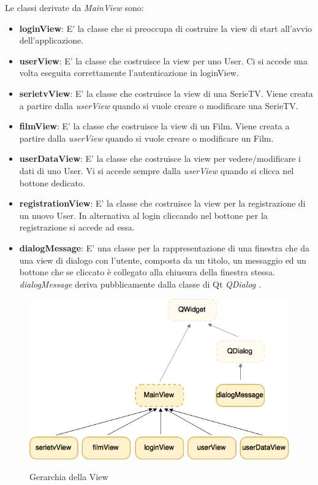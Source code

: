 \documentclass[10pt,a4paper,openany]{article}
\begin{document}
	Le classi derivate da \emph{MainView} sono:
	\begin{itemize}
		\item \textbf{loginView}: E' la classe che si preoccupa di costruire la view di start all'avvio dell'applicazione.
		\item \textbf{userView}: E' la classe che costruisce la view per uno User. Ci si accede una volta eseguita correttamente l'autenticazione in loginView.
		\item \textbf{serietvView}: E' la classe che costruisce la view di una SerieTV. Viene creata a partire dalla \emph{userView} quando si vuole creare o modificare 
		una SerieTV.
		\item \textbf{filmView}: E' la classe che costruisce la view di un Film. Viene creata a partire dalla \emph{userView} quando si vuole creare o modificare 
		un Film.
		\item \textbf{userDataView}: E' la classe che costruisce la view per vedere/modificare i dati di uno User. Vi si accede sempre dalla \emph{userView} quando
		si clicca nel bottone dedicato.
		\item \textbf{registrationView}: E' la classe che costruisce la view per la registrazione di un nuovo User.  In alternativa al login cliccando nel bottone per la 
		registrazione si accede ad essa.
		\item \textbf{dialogMessage}: E' una classe per la rappresentazione di una finestra che da una view di dialogo con l'utente, composta da un titolo, un 
		messaggio ed un bottone che se cliccato è collegato alla chiusura della finestra stessa. \emph{dialogMessage} deriva pubblicamente dalla classe di Qt 
		\emph{QDialog} .
	\end{itemize}
		
		\newpage
		
		
		\begin{figure}[!h]
			\centering
			\includegraphics[angle=0,scale=.50]{View.png}\\
			\caption{Gerarchia della View}
			\label{fig:View}
		\end{figure}
	
\end{document}
